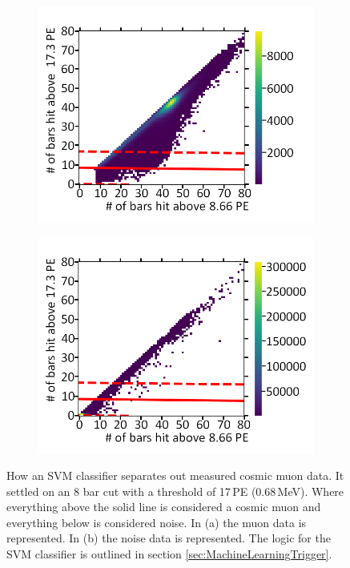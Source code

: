 \begin{figure}[!h]
\centering
\begin{subfigure}{.5\textwidth}
  \centering
  \includegraphics[width=\linewidth]{Chapter6/Figs/Raster/Cosmic8BarSignalCutSvmMedText.png}
  \captionsetup{width=.9\linewidth}
  \caption{}
  \label{subFig:cosmic8BarSignalCutSVM}
\end{subfigure}%
\begin{subfigure}{.5\textwidth}
  \centering
\includegraphics[width=\linewidth]{Chapter6/Figs/Raster/Cosmic8BarNoiseCutSvmMedText.png}
  \captionsetup{width=.9\linewidth}
  \caption{}
  \label{subFig:cosmic8BarNoiseCutSVM}
\end{subfigure}
\caption[An SVM classifier separating cosmic signal from noise.]{How an SVM classifier separates out measured cosmic muon data. It settled on an 8 bar cut with a threshold of 17\,PE (0.68\,MeV). Where everything above the solid line is considered a cosmic muon and everything below is considered noise. In (a) the muon data is represented. In (b) the noise data is represented. The logic for the SVM classifier is outlined in section \ref{sec:MachineLearningTrigger}.}
\label{fig:cosmic8BarSignalNoiseCutSVM}
\end{figure}

